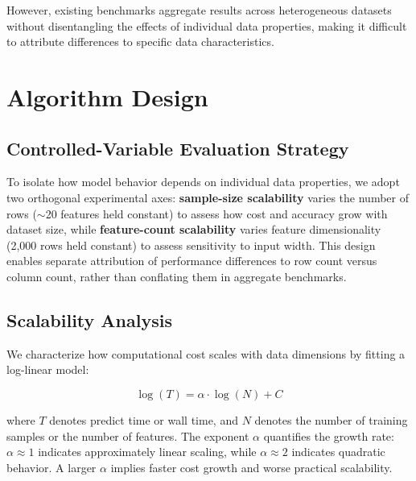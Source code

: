 \documentclass{SYSUReport}
\begin{document}
However, existing benchmarks aggregate results across heterogeneous datasets without disentangling the effects of individual data properties, making it difficult to attribute differences to specific data characteristics.






\section{Algorithm Design}

\subsection{Controlled-Variable Evaluation Strategy}
To isolate how model behavior depends on individual data properties, we adopt two orthogonal experimental axes: \textbf{sample-size scalability} varies the number of rows ($\sim$20 features held constant) to assess how cost and accuracy grow with dataset size, while \textbf{feature-count scalability} varies feature dimensionality (2,000 rows held constant) to assess sensitivity to input width. This design enables separate attribution of performance differences to row count versus column count, rather than conflating them in aggregate benchmarks.

\subsection{Scalability Analysis}
We characterize how computational cost scales with data dimensions by fitting a log-linear model:

\begin{equation}
    \log(T) = \alpha \cdot \log(N) + C
\end{equation}

where $T$ denotes predict time or wall time, and $N$ denotes the number of training samples or the number of features. The exponent $\alpha$ quantifies the growth rate: $\alpha \approx 1$ indicates approximately linear scaling, while $\alpha \approx 2$ indicates quadratic behavior. A larger $\alpha$ implies faster cost growth and worse practical scalability.
\end{document}

